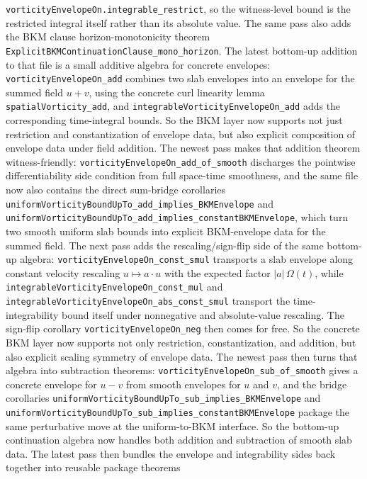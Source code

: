 \documentclass[11pt]{article}
\begin{document}
\texttt{vorticityEnvelopeOn.integrable\_restrict}, so the witness-level bound is
the restricted integral itself rather than its absolute value.  The same pass
also adds the BKM clause horizon-monotonicity theorem
\texttt{ExplicitBKMContinuationClause\_mono\_horizon}.  The latest bottom-up
addition to that file is a small additive algebra for concrete envelopes:
\texttt{vorticityEnvelopeOn\_add} combines two slab envelopes into an envelope
for the summed field \(u+v\), using the concrete curl linearity lemma
\texttt{spatialVorticity\_add}, and
\texttt{integrableVorticityEnvelopeOn\_add} adds the corresponding time-integral
bounds.  So the BKM layer now supports not just restriction and constantization
of envelope data, but also explicit composition of envelope data under field
addition.  The newest pass makes that addition theorem witness-friendly:
\texttt{vorticityEnvelopeOn\_add\_of\_smooth} discharges the pointwise
differentiability side condition from full space-time smoothness, and the same
file now also contains the direct sum-bridge corollaries
\texttt{uniformVorticityBoundUpTo\_add\_implies\_BKMEnvelope} and
\texttt{uniformVorticityBoundUpTo\_add\_implies\_constantBKMEnvelope}, which
turn two smooth uniform slab bounds into explicit BKM-envelope data for the
summed field.  The next pass adds the rescaling/sign-flip side of the same
bottom-up algebra: \texttt{vorticityEnvelopeOn\_const\_smul} transports a slab
envelope along constant velocity rescaling \(u \mapsto a \cdot u\) with the
expected factor \(|a|\,\Omega(t)\), while
\texttt{integrableVorticityEnvelopeOn\_const\_mul} and
\texttt{integrableVorticityEnvelopeOn\_abs\_const\_smul} transport the
time-integrability bound itself under nonnegative and absolute-value rescaling.
The sign-flip corollary \texttt{vorticityEnvelopeOn\_neg} then comes for free.
So the concrete BKM layer now supports not only restriction, constantization,
and addition, but also explicit scaling symmetry of envelope data.  The newest
pass then turns that algebra into subtraction theorems:
\texttt{vorticityEnvelopeOn\_sub\_of\_smooth} gives a concrete envelope for
\(u-v\) from smooth envelopes for \(u\) and \(v\), and the bridge corollaries
\texttt{uniformVorticityBoundUpTo\_sub\_implies\_BKMEnvelope} and
\texttt{uniformVorticityBoundUpTo\_sub\_implies\_constantBKMEnvelope} package
the same perturbative move at the uniform-to-BKM interface.  So the bottom-up
continuation algebra now handles both addition and subtraction of smooth slab
data.  The latest pass then bundles the envelope and integrability sides back
together into reusable package theorems
\end{document}
